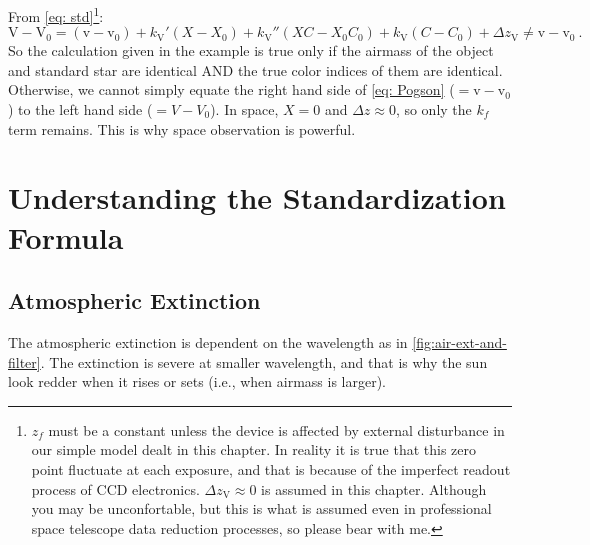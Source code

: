 
From \cref{eq: std}\footnote{$ z_{f} $ must be a constant unless the device is affected by external disturbance in our simple model dealt in this chapter. In reality it is true that this zero point fluctuate at each exposure, and that is because of the imperfect readout process of CCD electronics. $ \Delta z_\mathrm{V} \approx 0 $ is assumed in this chapter. Although you may be unconfortable, but this is what is assumed even in professional space telescope data reduction processes, so please bear with me.}:
\begin{equation}
  \mathrm{V} - \mathrm{V}_0 
    = (\mathrm{v} - \mathrm{v}_0)
    + k_\mathrm{V}'(X - X_0)
    + k_\mathrm{V}''(X C - X_0 C_0)
    + k_\mathrm{V}(C - C_0)
    + \Delta z_\mathrm{V}
    \neq \mathrm{v} - \mathrm{v}_0 ~.
\end{equation}
So the calculation given in the example is true only if the airmass of the object and standard star are identical AND the true color indices of them are identical. Otherwise, we cannot simply equate the right hand side of \cref{eq: Pogson} ($ = \mathrm{v} - \mathrm{v}_0 $) to the left hand side ($ = V - V_0 $). In space, $ X = 0 $ and $ \Delta z \approx 0 $, so only the $ k_f $ term remains. This is why space observation is powerful.

\section{Understanding the Standardization Formula}

\subsection{Atmospheric Extinction}
The atmospheric extinction is dependent on the wavelength as in \cref{fig:air-ext-and-filter}. The extinction is severe at smaller wavelength, and that is why the sun look redder when it rises or sets (i.e., when airmass is larger). 

